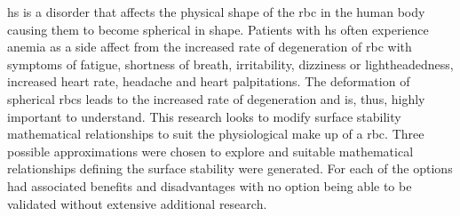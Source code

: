 \ac{hs} is a disorder that affects the physical shape of the \ac{rbc} in the human body causing them to become spherical in shape. Patients with \ac{hs} often experience anemia as a side affect from the increased rate of degeneration of \ac{rbc} with symptoms of fatigue, shortness of breath, irritability, dizziness or lightheadedness, increased heart rate, headache and heart palpitations. The deformation of spherical \ac{rbc}s leads to the increased rate of degeneration and is, thus, highly important to understand. This research looks to modify surface stability mathematical relationships to suit the physiological make up of a \ac{rbc}. Three possible approximations were chosen to explore and suitable mathematical relationships defining the surface stability were generated. For each of the options had associated benefits and disadvantages with no option being able to be validated without extensive additional research. 